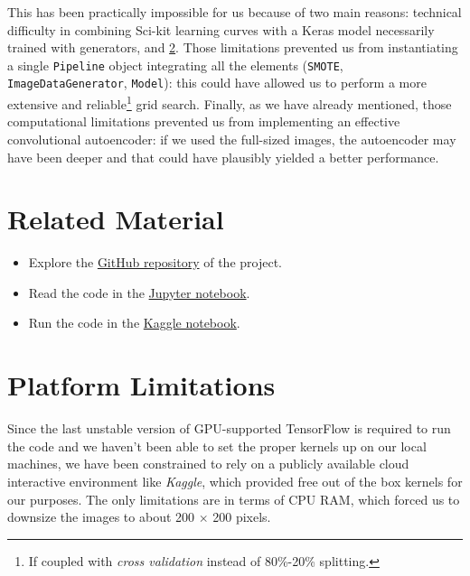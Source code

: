 \documentclass[aps,twocolumn,secnumarabic,nobalancelastpage,amsmath,amssymb,
nofootinbib]{revtex4}
\begin{document}
This has been practically impossible for us because of two main reasons:
technical difficulty in combining Sci-kit learning curves with a Keras
model necessarily trained with generators, and \ref{platform-limitations}. Those limitations prevented us from instantiating a single \texttt{Pipeline} object integrating all the elements (\texttt{SMOTE},
\texttt{ImageDataGenerator}, \texttt{Model}): this could have allowed us
to perform a more extensive and reliable\footnote{If coupled with
\emph{cross validation} instead of 80\%-20\% splitting.} grid search.
Finally, as we have already mentioned, those computational limitations
prevented us from implementing an effective convolutional autoencoder:
if we used the full-sized images, the autoencoder may have been deeper
and that could have plausibly yielded a better performance.


\appendix


\section{Related Material}\label{additional-material}

\begin{itemize}

\item
Explore the
\href{https://github.com/InPhyT/NeuralNetworksProject}{GitHub
	repository} of the project.
\vspace{-0.2cm}\item
Read the code in the
\href{https://nbviewer.jupyter.org/github/InPhyT/NeuralNetworksProject/Notebooks/notebook.ipynb}{Jupyter
	notebook}.
\vspace{-0.2cm}\item
Run the code in the
\href{https://www.kaggle.com/inphyt2020/neuralnetworksproject}{Kaggle
	notebook}.
\end{itemize}

\section{Platform Limitations}\label{platform-limitations}

Since the last unstable version of GPU-supported TensorFlow is required
to run the code and we haven't been able to set the proper kernels up on
our local machines, we have been constrained to rely on a publicly
available cloud interactive environment like \emph{Kaggle}, which
provided free out of the box kernels for our purposes. The only
limitations are in terms of CPU RAM, which forced us to downsize the
images to about 200 \(\times\) 200 pixels.
\end{document}
